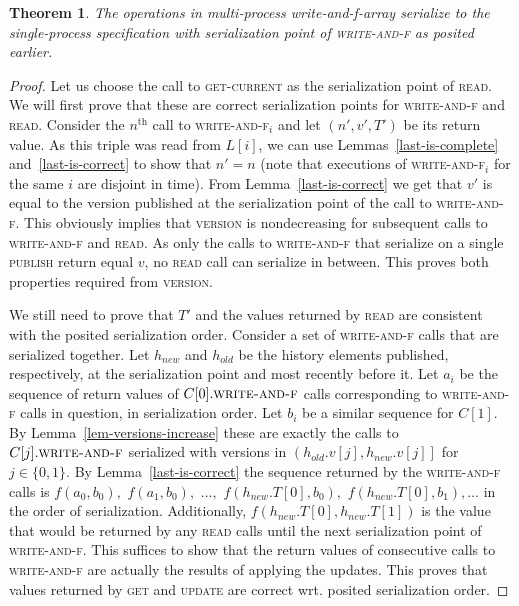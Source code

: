 \documentclass{thesis}
\newtheorem{theorem}{Theorem}
\newcommand{\fn}[1]{\textsc{#1}}
\begin{document}
\begin{theorem}
	The operations in multi-process write-and-f-array serialize to the single-process specification with serialization point of \fn{write-and-f} as posited earlier.
\end{theorem}
\begin{proof}
	Let us choose the call to \fn{get-current} as the serialization point of \fn{read}. 
	We will first prove that these are correct serialization points for \fn{write-and-f} and \fn{read}.
	Consider the $n^{\text{th}}$ call to \fn{write-and-f$_i$} and let $(n', v', T')$ be its return value. As this triple was read from $L[i]$, we can use Lemmas~\ref{last-is-complete} and~\ref{last-is-correct} to show that
	$n' = n$ (note that executions of \fn{write-and-f$_i$} for the same $i$ are disjoint in time). From Lemma~\ref{last-is-correct} we get that $v'$ is equal to the
	version published at the serialization point of the call to \fn{write-and-f}. This obviously implies that \fn{version} is nondecreasing for subsequent calls to \fn{write-and-f} and \fn{read}.
	As only the calls to \fn{write-and-f} that serialize on a single \fn{publish} return equal $v$, no \fn{read} call can serialize in between. This proves both properties required from \fn{version}.

	We still need to prove
		that $T'$ and the values returned by \fn{read} are consistent with the posited serialization order.
		Consider a set of \fn{write-and-f} calls that are serialized together. Let $h_{new}$ and $h_{old}$ be the history elements published, respectively, at the serialization point and most recently before it. Let $a_i$ be the sequence of return values
	of $C[0].\fn{write-and-f}$ calls corresponding to \fn{write-and-f} calls in question, in serialization order. Let $b_i$ be a similar sequence for $C[1]$. By Lemma~\ref{lem-versions-increase} these are exactly the calls to
	$C[j].\fn{write-and-f}$ serialized with versions in $\left(h_{old}.v[j], h_{new}.v[j]\right]$ for $j \in \{0, 1\}$. By Lemma~\ref{last-is-correct} the sequence returned
by the \fn{write-and-f} calls is $f(a_0, b_0), $ $f(a_1, b_0),$ $\ldots, $ $f(h_{new}.T[0], b_0), $ $f(h_{new}.T[0], b_1), \ldots$ in the order of serialization. 
Additionally, $f(h_{new}.T[0], h_{new}.T[1])$ is the value that would be returned by any \fn{read} calls until the next serialization point of \fn{write-and-f}.
This suffices to show that the return values of consecutive calls to \fn{write-and-f} are actually the results of applying the updates.
This proves that values returned by \fn{get} and \fn{update} are correct wrt. posited serialization order.
	

\end{proof}
\end{document}
